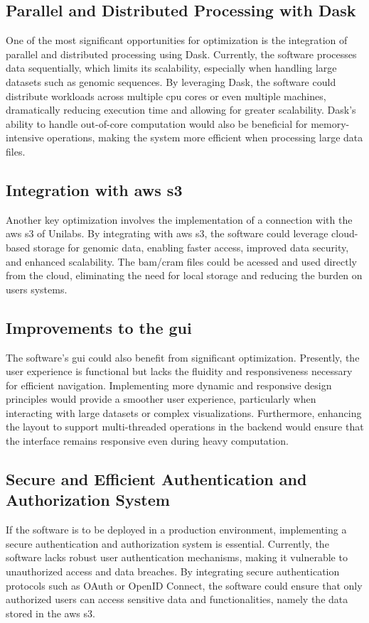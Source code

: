 \subsection{Parallel and Distributed Processing with Dask}
One of the most significant opportunities for optimization is the integration of parallel and distributed processing using Dask. Currently, the software processes data sequentially, which limits its scalability, especially when handling large datasets such as genomic sequences. By leveraging Dask, the software could distribute workloads across multiple \ac{cpu} cores or even multiple machines, dramatically reducing execution time and allowing for greater scalability. Dask's ability to handle out-of-core computation would also be beneficial for memory-intensive operations, making the system more efficient when processing large data files.

\subsection{Integration with \ac{aws} \ac{s3}}
Another key optimization involves the implementation of a connection with the \ac{aws} \ac{s3} of Unilabs. By integrating with \ac{aws} \ac{s3}, the software could leverage cloud-based storage for genomic data, enabling faster access, improved data security, and enhanced scalability. The \ac{bam}/\ac{cram} files could be acessed and used directly from the cloud, eliminating the need for local storage and reducing the burden on users systems. 

\subsection{Improvements to the \acl{gui}}
The software's \ac{gui} could also benefit from significant optimization. Presently, the user experience is functional but lacks the fluidity and responsiveness necessary for efficient navigation. Implementing more dynamic and responsive design principles would provide a smoother user experience, particularly when interacting with large datasets or complex visualizations. Furthermore, enhancing the layout to support multi-threaded operations in the backend would ensure that the interface remains responsive even during heavy computation.

\subsection{Secure and Efficient Authentication and Authorization System}
If the software is to be deployed in a production environment, implementing a secure authentication and authorization system is essential. Currently, the software lacks robust user authentication mechanisms, making it vulnerable to unauthorized access and data breaches. By integrating secure authentication protocols such as OAuth or OpenID Connect, the software could ensure that only authorized users can access sensitive data and functionalities, namely the data stored in the \ac{aws} \ac{s3}.

